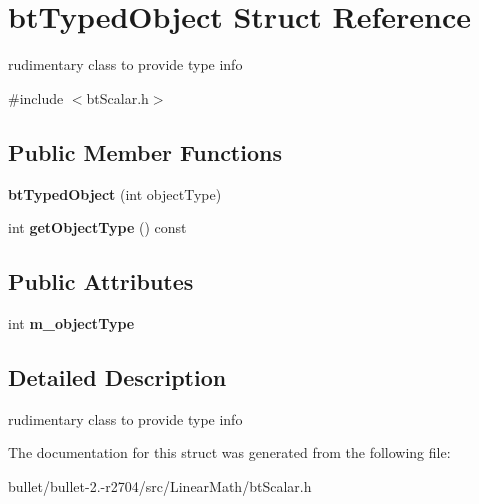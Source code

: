 \hypertarget{structbt_typed_object}{\section{bt\+Typed\+Object Struct Reference}
\label{structbt_typed_object}
}


rudimentary class to provide type info  




{\ttfamily \#include $<$bt\+Scalar.\+h$>$}

\subsection*{Public Member Functions}
\begin{DoxyCompactItemize}
\item 
\hypertarget{structbt_typed_object_a39d6ebc8daec78efccbcac59f64e7274}{{\bfseries bt\+Typed\+Object} (int object\+Type)}\label{structbt_typed_object_a39d6ebc8daec78efccbcac59f64e7274}

\item 
\hypertarget{structbt_typed_object_a262645ba0e1fafcd09494e581454630a}{int {\bfseries get\+Object\+Type} () const }\label{structbt_typed_object_a262645ba0e1fafcd09494e581454630a}

\end{DoxyCompactItemize}
\subsection*{Public Attributes}
\begin{DoxyCompactItemize}
\item 
\hypertarget{structbt_typed_object_ad480e8d21b894fff4485239651fc23e6}{int {\bfseries m\+\_\+object\+Type}}\label{structbt_typed_object_ad480e8d21b894fff4485239651fc23e6}

\end{DoxyCompactItemize}


\subsection{Detailed Description}
rudimentary class to provide type info 

The documentation for this struct was generated from the following file\+:\begin{DoxyCompactItemize}
\item 
bullet/bullet-\/2.-\/r2704/src/\+Linear\+Math/bt\+Scalar.\+h\end{DoxyCompactItemize}
